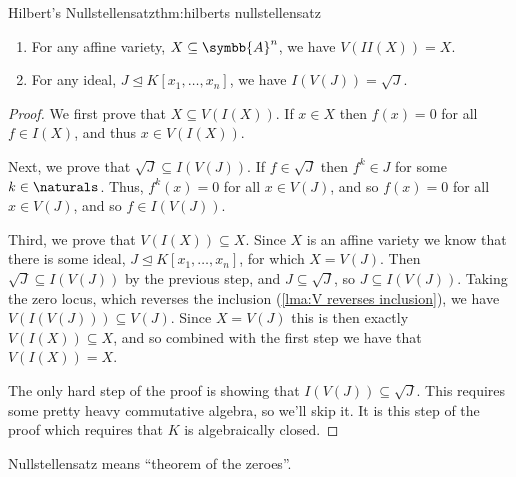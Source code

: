 \documentclass[fleqn]{NotesClass}
\newcommand{\subideal}{\trianglelefteq}
\newcommand{\affine}{\symbb{A}}
\begin{document}
    \begin{thm}{Hilbert's Nullstellensatz}{thm:hilberts nullstellensatz}
        \begin{enumerate}
            \item For any affine variety, \(X \subseteq \affine^n\), we have \(V(II(X)) = X\).
            \item For any ideal, \(J \subideal K[x_1, \dotsc, x_n]\), we have \(I(V(J)) = \sqrt{J}\).
        \end{enumerate}
        \begin{proof}
            We first prove that \(X \subseteq V(I(X))\).
            If \(x \in X\) then \(f(x) = 0\) for all \(f \in I(X)\), and thus \(x \in V(I(X))\).
            
            Next, we prove that \(\sqrt{J} \subseteq I(V(J))\).
            If \(f \in \sqrt{J}\) then \(f^k \in J\) for some \(k \in \naturals\).
            Thus, \(f^k(x) = 0\) for all \(x \in V(J)\), and so \(f(x) = 0\) for all \(x \in V(J)\), and so \(f \in I(V(J))\).
            
            Third, we prove that \(V(I(X)) \subseteq X\).
            Since \(X\) is an affine variety we know that there is some ideal, \(J \subideal K[x_1, \dotsc, x_n]\), for which \(X = V(J)\).
            Then \(\sqrt{J} \subseteq I(V(J))\) by the previous step, and \(J \subseteq \sqrt{J}\), so \(J \subseteq I(V(J))\).
            Taking the zero locus, which reverses the inclusion (\cref{lma:V reverses inclusion}), we have \(V(I(V(J))) \subseteq V(J)\).
            Since \(X = V(J)\) this is then exactly \(V(I(X)) \subseteq X\), and so combined with the first step we have that \(V(I(X)) = X\).
            
            The only hard step of the proof is showing that \(I(V(J)) \subseteq \sqrt{J}\).
            This requires some pretty heavy commutative algebra, so we'll skip it.
            It is this step of the proof which requires that \(K\) is algebraically closed.
        \end{proof}
    \end{thm}
    
    \begin{remark}{}{}
        Nullstellensatz means \enquote{theorem of the zeroes}.
    \end{remark}
    
\end{document}
